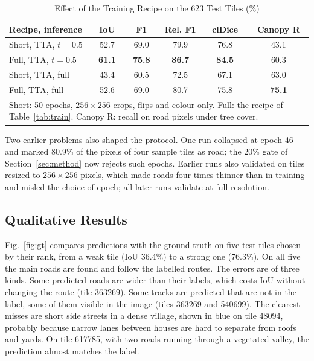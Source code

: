 \documentclass{ieeeaccess}
\begin{document}
\begin{table}[t]
\caption{Effect of the Training Recipe on the 623 Test Tiles (\%)}
\label{tab:recipe}
\setlength{\tabcolsep}{2pt}
\tablebodyfont
\begin{tabular}{|l|c|c|c|c|c|}
\hline
Recipe, inference & IoU & F1 & Rel. F1 & clDice & Canopy R \\
\hline
Short, TTA, $t = 0.5$ & 52.7 & 69.0 & 79.9 & 76.8 & 43.1 \\
Full, TTA, $t = 0.5$ & \textbf{61.1} & \textbf{75.8} & \textbf{86.7} & \textbf{84.5} & 60.3 \\
Short, TTA, full & 43.4 & 60.5 & 72.5 & 67.1 & 63.0 \\
Full, TTA, full & 52.6 & 69.0 & 80.7 & 75.8 & \textbf{75.1} \\
\hline
\multicolumn{6}{p{215pt}}{Short: 50 epochs, $256 \times 256$ crops, flips and colour only. Full: the recipe of Table~\ref{tab:train}. Canopy R: recall on road pixels under tree cover.}
\end{tabular}
\end{table}

Two earlier problems also shaped the protocol. One run collapsed at epoch 46 and marked 80.9\% of the pixels of four sample tiles as road; the 20\% gate of Section~\ref{sec:method} now rejects such epochs. Earlier runs also validated on tiles resized to $256 \times 256$ pixels, which made roads four times thinner than in training and misled the choice of epoch; all later runs validate at full resolution.

\subsection{Qualitative Results}

Fig.~\ref{fig:gt} compares predictions with the ground truth on five test tiles chosen by their rank, from a weak tile (IoU 36.4\%) to a strong one (76.3\%). On all five the main roads are found and follow the labelled routes. The errors are of three kinds. Some predicted roads are wider than their labels, which costs IoU without changing the route (tile 363269). Some tracks are predicted that are not in the label, some of them visible in the image (tiles 363269 and 540699). The clearest misses are short side streets in a dense village, shown in blue on tile 48094, probably because narrow lanes between houses are hard to separate from roofs and yards. On tile 617785, with two roads running through a vegetated valley, the prediction almost matches the label.
\end{document}
